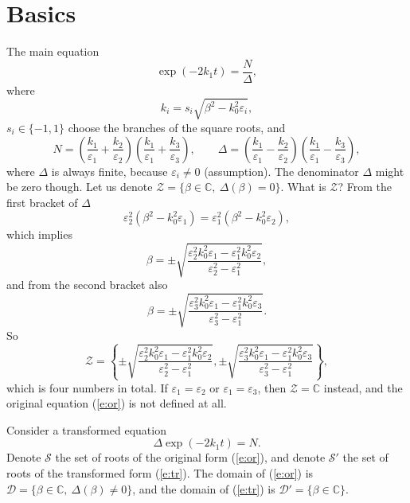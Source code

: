 \documentclass[12pt]{article}
\newcommand{\rf}[1]{(\ref{#1})}
\newcommand{\rb}[1]{\left(#1\right)}
\newcommand{\cub}[1]{\left\{#1\right\}}
\newcommand{\eps}{\varepsilon}
\begin{document}
\section{Basics}
The main equation
\begin{equation}
\exp(-2 k_1 t) = \frac{N}{\Delta},
\label{e:or}
\end{equation}
where
\begin{equation}
k_i=s_i\sqrt{\beta^2-k_0^2\eps_i},
\end{equation}
$s_i\in\{-1,1\}$ choose the branches of the square roots, and
\begin{equation}
N = \rb{\frac{k_1}{\eps_1}+\frac{k_2}{\eps_2}}\rb{\frac{k_1}{\eps_1}+\frac{k_3}{\eps_3}},\qquad \Delta = \rb{\frac{k_1}{\eps_1}-\frac{k_2}{\eps_2}}\rb{\frac{k_1}{\eps_1}-\frac{k_3}{\eps_3}},
\end{equation}
where $\Delta$ is always finite, because $\eps_i \neq 0$ (assumption). The denominator $\Delta$ might be zero though. Let us denote $\mathcal{Z} = \{\beta \in \mathbb{C},\ \Delta(\beta) = 0\}$. What is $\mathcal{Z}$? From the first bracket of $\Delta$
\begin{equation}
\eps_2^2 (\beta^2-k_0^2\eps_1) = \eps_1^2 (\beta^2-k_0^2\eps_2),
\end{equation}
which implies
\begin{equation}
\beta = \pm\sqrt{\frac{\eps_2^2 k_0^2 \eps_1-\eps_1^2 k_0^2 \eps_2}{\eps_2^2-\eps_1^2}},
\end{equation}
and from the second bracket also
\begin{equation}
\beta = \pm\sqrt{\frac{\eps_3^2 k_0^2 \eps_1-\eps_1^2 k_0^2 \eps_3}{\eps_3^2-\eps_1^2}}.
\end{equation}
So
\begin{equation}
\mathcal{Z} = \cub{\pm\sqrt{\frac{\eps_2^2 k_0^2 \eps_1-\eps_1^2 k_0^2 \eps_2}{\eps_2^2-\eps_1^2}},\pm\sqrt{\frac{\eps_3^2 k_0^2 \eps_1-\eps_1^2 k_0^2 \eps_3}{\eps_3^2-\eps_1^2}}},
\end{equation}
which is four numbers in total. If $\eps_1 = \eps_2$ or $\eps_1 = \eps_3$, then $\mathcal{Z} = \mathbb{C}$ instead, and the original equation \rf{e:or} is not defined at all.

Consider a transformed equation
\begin{equation}
\Delta\exp(-2 k_1 t) = N.
\label{e:tr}
\end{equation}
Denote $\mathcal{S}$ the set of roots of the original form \rf{e:or}, and denote $\mathcal{S}'$ the set of roots of the transformed form \rf{e:tr}. The domain of \rf{e:or} is $\mathcal{D} = \{\beta \in \mathbb{C},\ \Delta(\beta) \neq 0\}$, and the domain of \rf{e:tr} is $\mathcal{D}' = \{\beta \in \mathbb{C}\}$.
\end{document}
